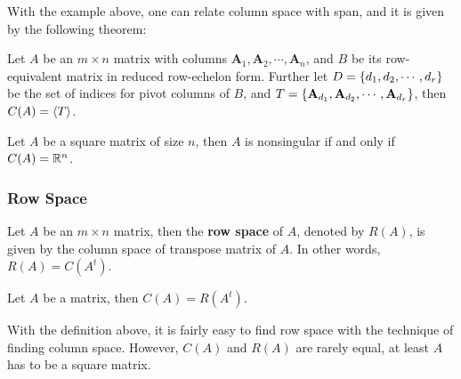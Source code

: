 \documentclass[a4paper,12pt]{article}
\begin{document}
With the example above, one can relate column space with span, and it is given by the following theorem:

\begin{thm}
  Let $A$ be an $m\times n$ matrix with columns $\mathbf{A}_{1},\mathbf{A}_{2},\cdots,\mathbf{A}_{n}$, and $B$ be its row-equivalent matrix in reduced row-echelon form. Further let $D=\left\{ d_{1},d_{2},\cdots,d_{r}\right\}$ be the set of indices for pivot columns of $B$, and $T=\left\{ \mathbf{A}_{d_{1}},\mathbf{A}_{d_{2}},\cdots,\mathbf{A}_{d_{r}}\right\}$, then $C(A)=\left\langle T\right\rangle$.
\end{thm}\n

\begin{thm}
  Let $A$ be a square matrix of size $n$, then $A$ is nonsingular if and only if $C(A)=\mathbb{R}^{n}$.
\end{thm}

\subsubsection{Row Space}
\begin{dft}
  Let $A$ be an $m\times n$ matrix, then the \textbf{row space} of $A$, denoted by $R(A)$, is given by the column space of transpose matrix of $A$. In other words, $R(A)=C(A^{t})$.
\end{dft}\n

\begin{pst}
  Let $A$ be a matrix, then $C(A)=R(A^{t})$.
\end{pst}\n

With the definition above, it is fairly easy to find row space with the technique of finding column space. However, $C(A)$ and $R(A)$ are rarely equal, at least $A$ has to be a square matrix.\n
\end{document}
